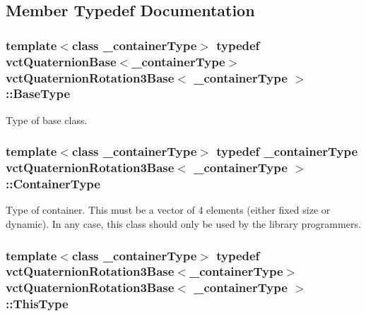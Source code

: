 \subsection{Member Typedef Documentation}
\hypertarget{classvct_quaternion_rotation3_base_aec53a8354bebb034598fe2b02ffc8217}{}
\subsubsection[{Base\+Type}]{\setlength{\rightskip}{0pt plus 5cm}template$<$class \+\_\+container\+Type$>$ typedef {\bf vct\+Quaternion\+Base}$<$\+\_\+container\+Type$>$ {\bf vct\+Quaternion\+Rotation3\+Base}$<$ \+\_\+container\+Type $>$\+::{\bf Base\+Type}}\label{classvct_quaternion_rotation3_base_aec53a8354bebb034598fe2b02ffc8217}
Type of base class. \hypertarget{classvct_quaternion_rotation3_base_a41c3b08279a5560f43351c14666c9c6a}{}
\subsubsection[{Container\+Type}]{\setlength{\rightskip}{0pt plus 5cm}template$<$class \+\_\+container\+Type$>$ typedef \+\_\+container\+Type {\bf vct\+Quaternion\+Rotation3\+Base}$<$ \+\_\+container\+Type $>$\+::{\bf Container\+Type}}\label{classvct_quaternion_rotation3_base_a41c3b08279a5560f43351c14666c9c6a}
Type of container. This must be a vector of 4 elements (either fixed size or dynamic). In any case, this class should only be used by the library programmers. \hypertarget{classvct_quaternion_rotation3_base_aff1feb6ba01e2cbc6f455a140992e728}{}
\subsubsection[{This\+Type}]{\setlength{\rightskip}{0pt plus 5cm}template$<$class \+\_\+container\+Type$>$ typedef {\bf vct\+Quaternion\+Rotation3\+Base}$<$\+\_\+container\+Type$>$ {\bf vct\+Quaternion\+Rotation3\+Base}$<$ \+\_\+container\+Type $>$\+::{\bf This\+Type}}\label{classvct_quaternion_rotation3_base_aff1feb6ba01e2cbc6f455a140992e728}
\hypertarget{classvct_quaternion_rotation3_base_a78f36636344dd97b9837f9b15aedd1f7}{}
